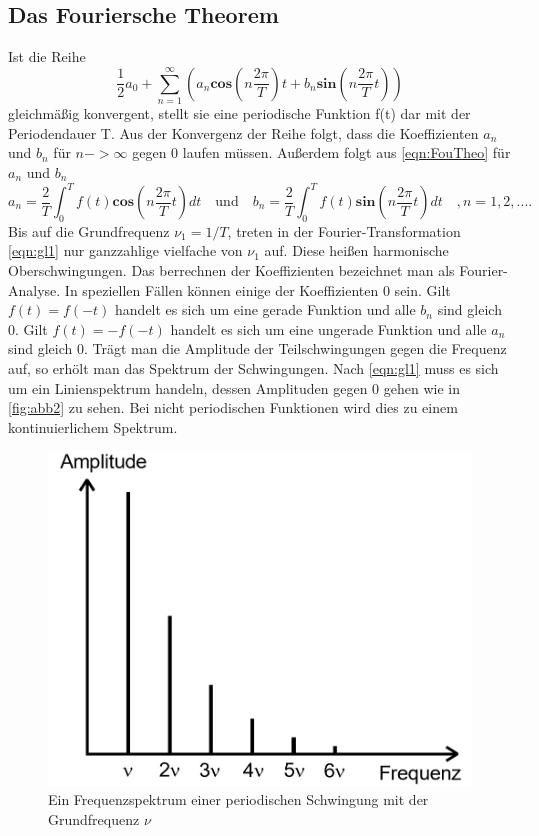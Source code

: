 \subsection{Das Fouriersche Theorem}
\label{sec:Fouriersche Theorem}
Ist die Reihe
\begin{equation}
  \frac{1}{2} a_0 + \sum_{n = 1}^{\infty} \left( a_n \symbf{cos} (n \frac{2 \pi}{T} )t + b_n \symbf{sin} (n \frac{2 \pi}{T} t) \right)
  \label{eqn:gl1}
\end{equation}
gleichmäßig konvergent, stellt sie eine periodische Funktion f(t) dar mit der Periodendauer T.
Aus der Konvergenz der Reihe folgt, dass die Koeffizienten $a_n$ und $b_n$ für $n -> \infty$ gegen 0 laufen müssen.
Außerdem folgt aus \ref{eqn:FouTheo} für $a_n$ und $b_n$
\begin{equation}
  a_n = \frac{2}{T} \int_0^T f(t) \symbf{cos} (n \frac{2 \pi}{T} t) dt \quad
  \textrm{und} \quad
  b_n = \frac{2}{T} \int_0^T f(t) \symbf{sin} (n \frac{2 \pi}{T} t) dt \quad
  ,n= 1, 2, ....
  \label{eqn:gl2}
\end{equation}
Bis auf die Grundfrequenz $\nu_1 = 1/T$, treten in der Fourier-Transformation \ref{eqn:gl1} nur ganzzahlige vielfache von $\nu_1$ auf.
Diese heißen harmonische Oberschwingungen.
Das berrechnen der Koeffizienten bezeichnet man als Fourier-Analyse.
In speziellen Fällen können einige der Koeffizienten 0 sein.
Gilt $f(t) = f(-t)$ handelt es sich um eine gerade Funktion und alle $b_n$ sind gleich 0.
Gilt $f(t) = -f(-t)$ handelt es sich um eine ungerade Funktion und alle $a_n$ sind gleich 0.
Trägt man die Amplitude der Teilschwingungen gegen die Frequenz auf, so erhölt man das Spektrum der Schwingungen.
Nach \ref{eqn:gl1} muss es sich um ein Linienspektrum handeln, dessen Amplituden gegen 0 gehen wie in \ref{fig:abb2} zu sehen.
Bei nicht periodischen Funktionen wird dies zu einem kontinuierlichem Spektrum.
\begin{figure}
  \centering
  \includegraphics[width=\textwidth]{abb1.jpg}
  \caption{Ein Frequenzspektrum einer periodischen Schwingung mit der Grundfrequenz $\nu$}
  \label{fig:abb1}
\end{figure}

